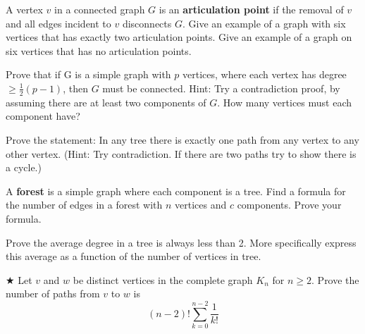 \begin{exercise}
A vertex $v$ in a connected graph $G$ is an {\bf articulation point} if the removal of $v$ and all edges incident to $v$ disconnects $G$.  Give an example of a graph with six vertices that has exactly two articulation points.  Give an example of a graph on six vertices that has no articulation points.
\end{exercise}




\begin{proofp}
Prove that if G is a simple graph with $p$ vertices, where each vertex has degree $\ge \frac{1}{2}(p-1)$, then $G$ must be connected.  Hint: Try a contradiction proof, by assuming there are at least two components of $G$.  How many vertices must each component have?
\end{proofp}

\begin{proofp}
Prove the statement: In any tree there is exactly one path from any vertex to any other vertex. (Hint: Try contradiction. If there are two paths try to show there is a cycle.)
\end{proofp}



\begin{proofp}
A {\bf forest} is a simple graph where each component is a tree.  Find a formula for the number of edges in a forest with $n$ vertices and $c$ components.  Prove your formula. 
\end{proofp}

\begin{proofp}
Prove the average degree in a tree is always less than 2. More specifically express this average as a function of the number of vertices in tree.
\end{proofp}



\begin{proofp}$\bigstar$
Let $v$ and $w$ be distinct vertices in the complete graph $K_n$ for $n \ge 2$.  Prove the number of paths from $v$ to $w$ is
$$(n-2)!\sum^{n-2}_{k=0}\frac{1}{k!}$$
\end{proofp}

